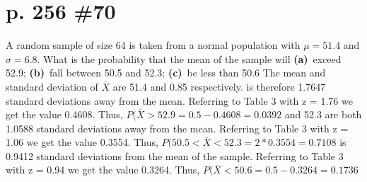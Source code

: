 \documentclass[12pt]{article}
\begin{document}
	\section[20pt]{p. 256 \#70}
	A random sample of size 64 is taken from a normal population with \(\mu=51.4\) and \(\sigma=6.8\). What is the probability that the mean of the sample will \newline
	\textbf{(a)}\ exceed 52.9; \newline
	\textbf{(b)}\ fall between 50.5 and 52.3; \newline
	\textbf{(c)}\ be less than 50.6 \newline \newline
	The mean and standard deviation of \(\overline{X}\) are 51.4 and 0.85 respectively. \newline {} is therefore 1.7647 standard deviations away from the mean. \newline
	Referring to Table 3 with z = 1.76 we get the value 0.4608. Thus, \(P(\overline{X}>52.9=0.5-0.4608=0.0392\)
	\newline
	\newline
	 and 52.3 are both 1.0588 standard deviations away from the mean. \newline
	Referring to Table 3 with z = 1.06 we get the value 0.3554. Thus, \(P(50.5<\overline{X}<52.3=2*0.3554=0.7108\)
	\newline
	\newline
	 is 0.9412 standard deviations from the mean of the sample.
	Referring to Table 3 with z = 0.94 we get the value 0.3264. Thus, \(P(\overline{X}<50.6=0.5-0.3264=0.1736\)
	\newline
	\newpage
\end{document}
